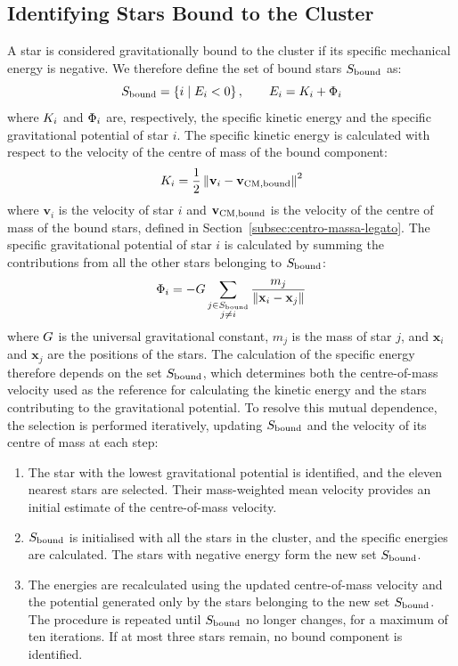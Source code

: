 \subsection{Identifying Stars Bound to the Cluster}
\label{subsec:stelle-legate}
A star is considered gravitationally bound to the cluster if its specific mechanical energy is negative. We therefore define the set of bound stars $S_{\mathrm{bound}}$ as:
\begin{equation}
	S_{\mathrm{bound}} = \left\{i \mid E_i < 0\right\},
	\qquad E_i = K_i + \Phi_i
	\label{eq:bound-stars}
\end{equation}
where $K_i$ and $\Phi_i$ are, respectively, the specific kinetic energy and the specific gravitational potential of star $i$.
The specific kinetic energy is calculated with respect to the velocity of the centre of mass of the bound component:
\begin{equation}
	K_i = \frac{1}{2}
	\left\|\mathbf{v}_i-\mathbf{v}_{\mathrm{CM,bound}}\right\|^2
	\label{eq:stellar-kinetic-energy}
\end{equation}
where $\mathbf{v}_i$ is the velocity of star $i$ and $\mathbf{v}_{\mathrm{CM,bound}}$ is the velocity of the centre of mass of the bound stars, defined in Section~\ref{subsec:centro-massa-legato}.
The specific gravitational potential of star $i$ is calculated by summing the contributions from all the other stars belonging to $S_{\mathrm{bound}}$:
\begin{equation}
	\Phi_i = -G \sum_{\substack{j \in S_{\mathrm{bound}} \\ j \neq i}}
	\frac{m_j}{\left\|\mathbf{x}_i-\mathbf{x}_j\right\|}
	\label{eq:stellar-potential}
\end{equation}
where $G$ is the universal gravitational constant, $m_j$ is the mass of star $j$, and $\mathbf{x}_i$ and $\mathbf{x}_j$ are the positions of the stars.
The calculation of the specific energy therefore depends on the set $S_{\mathrm{bound}}$, which determines both the centre-of-mass velocity used as the reference for calculating the kinetic energy and the stars contributing to the gravitational potential. To resolve this mutual dependence, the selection is performed iteratively, updating $S_{\mathrm{bound}}$ and the velocity of its centre of mass at each step:
\begin{enumerate}
	\item The star with the lowest gravitational potential is identified, and the eleven nearest stars are selected. Their mass-weighted mean velocity provides an initial estimate of the centre-of-mass velocity.
	\item $S_{\mathrm{bound}}$ is initialised with all the stars in the cluster, and the specific energies are calculated. The stars with negative energy form the new set $S_{\mathrm{bound}}$.
	\item The energies are recalculated using the updated centre-of-mass velocity and the potential generated only by the stars belonging to the new set $S_{\mathrm{bound}}$. The procedure is repeated until $S_{\mathrm{bound}}$ no longer changes, for a maximum of ten iterations. If at most three stars remain, no bound component is identified.
\end{enumerate}
